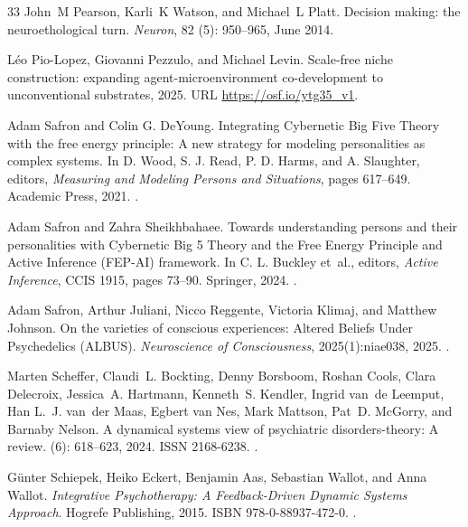 \documentclass[12pt,fleqn]{article}
\begin{document}
\begin{thebibliography}{33}
  John~M Pearson, Karli~K Watson, and Michael~L Platt.
  \newblock Decision making: the neuroethological turn.
  \newblock \emph{Neuron}, 82 (5): 950--965, June 2014.

  L\'eo Pio-Lopez, Giovanni Pezzulo, and Michael Levin.
  \newblock Scale-free niche construction: expanding agent-microenvironment
  co-development to unconventional substrates, 2025.
  \newblock URL \url{https://osf.io/ytg35_v1}.

  Adam Safron and Colin G. DeYoung.
  \newblock Integrating Cybernetic Big Five Theory with the free energy
  principle: A new strategy for modeling personalities as complex systems.
  \newblock In D. Wood, S. J. Read, P. D. Harms, and A. Slaughter, editors,
  \emph{Measuring and Modeling Persons and Situations}, pages 617--649.
  Academic Press, 2021.
  \newblock {}.

  Adam Safron and Zahra Sheikhbahaee.
  \newblock Towards understanding persons and their personalities with
  Cybernetic Big 5 Theory and the Free Energy Principle and Active Inference
  (FEP-AI) framework.
  \newblock In C. L. Buckley et~al., editors, \emph{Active Inference},
  CCIS 1915, pages 73--90. Springer, 2024.
  \newblock {}.

  Adam Safron, Arthur Juliani, Nicco Reggente, Victoria Klimaj, and Matthew Johnson.
  \newblock On the varieties of conscious experiences: Altered Beliefs Under
  Psychedelics (ALBUS).
  \newblock \emph{Neuroscience of Consciousness}, 2025(1):niae038, 2025.
  \newblock {}.

  Marten Scheffer, Claudi~L. Bockting, Denny Borsboom, Roshan Cools, Clara
  Delecroix, Jessica~A. Hartmann, Kenneth~S. Kendler, Ingrid van~de Leemput,
  Han L.~J. van~der Maas, Egbert van Nes, Mark Mattson, Pat~D. {McGorry}, and
  Barnaby Nelson.
  \newblock A dynamical systems view of psychiatric disorders-theory: A review.
   (6): 618--623, 2024.
  \newblock ISSN 2168-6238.
  \newblock {}.

  G\"unter Schiepek, Heiko Eckert, Benjamin Aas, Sebastian Wallot, and Anna
  Wallot.
  \newblock \emph{Integrative Psychotherapy: A Feedback-Driven Dynamic Systems
    Approach}.
  \newblock Hogrefe Publishing, 2015.
  \newblock ISBN 978-0-88937-472-0.
  \newblock {}.


\end{thebibliography}
\end{document}
